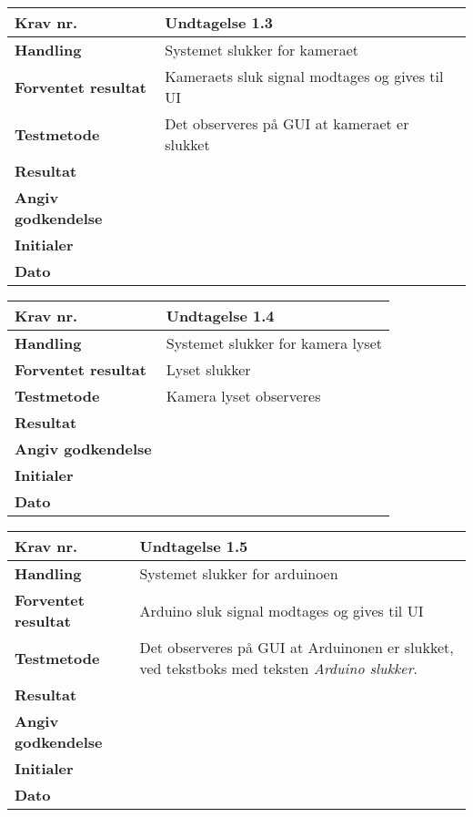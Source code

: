 	\begin{center}
		\begin{longtable}{ | m{4cm}| m{8.5cm}|} 
			\hline
			\textbf{Krav nr.} & Undtagelse 1.3  \\ 
			\hline
			\textbf{Handling} & Systemet slukker for kameraet  \\
			\hline
			\textbf{Forventet resultat} & Kameraets sluk signal modtages og gives til UI \\
			\hline
			\textbf{Testmetode}  & Det observeres på GUI at kameraet er slukket  \\
			\hline
			\textbf{Resultat}  &    \\
			\hline
			\textbf{Angiv godkendelse} &     \\
			\hline
			\textbf{Initialer} &     \\
			\hline
			\textbf{Dato} &    \\
			\hline
		\end{longtable}
	\end{center}
			
	\begin{center}
		\begin{longtable}{ | m{4cm}| m{8.5cm}|} 
			\hline
			\textbf{Krav nr.} & Undtagelse 1.4  \\ 
			\hline
			\textbf{Handling} & Systemet slukker for kamera lyset   \\
			\hline
			\textbf{Forventet resultat} & Lyset slukker \\
			\hline
			\textbf{Testmetode}  & Kamera lyset observeres  \\
			\hline
			\textbf{Resultat}  &    \\
			\hline
			\textbf{Angiv godkendelse} &     \\
			\hline
			\textbf{Initialer} &     \\
			\hline
			\textbf{Dato} &    \\
			\hline
		\end{longtable}
	\end{center}		
			
\newpage			
			
	\begin{center}
		\begin{longtable}{ | m{4cm}| m{8.5cm}|} 
			\hline
			\textbf{Krav nr.} & Undtagelse 1.5  \\ 
			\hline
			\textbf{Handling} & Systemet slukker for arduinoen   \\
			\hline
			\textbf{Forventet resultat} & Arduino sluk signal modtages og gives til UI \\
			\hline
			\textbf{Testmetode}  & Det observeres på GUI at Arduinonen er slukket, ved tekstboks med teksten \textit{Arduino slukker}.  \\
			\hline
			\textbf{Resultat}  &    \\
			\hline
			\textbf{Angiv godkendelse} &     \\
			\hline
			\textbf{Initialer} &     \\
			\hline
			\textbf{Dato} &    \\
			\hline
		\end{longtable}
	\end{center}